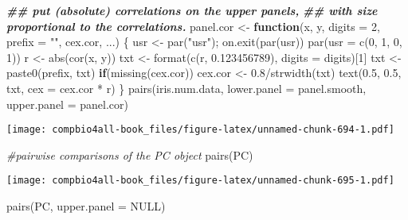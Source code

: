 \documentclass[
]{book}
\newenvironment{Shaded}{\begin{snugshade}}{\end{snugshade}}
\newcommand{\AttributeTok}[1]{\textcolor[rgb]{0.77,0.63,0.00}{#1}}
\newcommand{\CommentTok}[1]{\textcolor[rgb]{0.56,0.35,0.01}{\textit{#1}}}
\newcommand{\ConstantTok}[1]{\textcolor[rgb]{0.00,0.00,0.00}{#1}}
\newcommand{\ControlFlowTok}[1]{\textcolor[rgb]{0.13,0.29,0.53}{\textbf{#1}}}
\newcommand{\DecValTok}[1]{\textcolor[rgb]{0.00,0.00,0.81}{#1}}
\newcommand{\DocumentationTok}[1]{\textcolor[rgb]{0.56,0.35,0.01}{\textbf{\textit{#1}}}}
\newcommand{\FloatTok}[1]{\textcolor[rgb]{0.00,0.00,0.81}{#1}}
\newcommand{\FunctionTok}[1]{\textcolor[rgb]{0.00,0.00,0.00}{#1}}
\newcommand{\NormalTok}[1]{#1}
\newcommand{\OtherTok}[1]{\textcolor[rgb]{0.56,0.35,0.01}{#1}}
\newcommand{\SpecialCharTok}[1]{\textcolor[rgb]{0.00,0.00,0.00}{#1}}
\newcommand{\StringTok}[1]{\textcolor[rgb]{0.31,0.60,0.02}{#1}}
\begin{document}
\begin{Shaded}
\begin{Highlighting}[]
\DocumentationTok{\#\# put (absolute) correlations on the upper panels,}
\DocumentationTok{\#\# with size proportional to the correlations.}
\NormalTok{panel.cor }\OtherTok{\textless{}{-}} \ControlFlowTok{function}\NormalTok{(x, y, }\AttributeTok{digits =} \DecValTok{2}\NormalTok{, }\AttributeTok{prefix =} \StringTok{""}\NormalTok{, cex.cor, ...)}
\NormalTok{\{}
\NormalTok{  usr }\OtherTok{\textless{}{-}} \FunctionTok{par}\NormalTok{(}\StringTok{"usr"}\NormalTok{); }\FunctionTok{on.exit}\NormalTok{(}\FunctionTok{par}\NormalTok{(usr))}
  \FunctionTok{par}\NormalTok{(}\AttributeTok{usr =} \FunctionTok{c}\NormalTok{(}\DecValTok{0}\NormalTok{, }\DecValTok{1}\NormalTok{, }\DecValTok{0}\NormalTok{, }\DecValTok{1}\NormalTok{))}
\NormalTok{  r }\OtherTok{\textless{}{-}} \FunctionTok{abs}\NormalTok{(}\FunctionTok{cor}\NormalTok{(x, y))}
\NormalTok{  txt }\OtherTok{\textless{}{-}} \FunctionTok{format}\NormalTok{(}\FunctionTok{c}\NormalTok{(r, }\FloatTok{0.123456789}\NormalTok{), }\AttributeTok{digits =}\NormalTok{ digits)[}\DecValTok{1}\NormalTok{]}
\NormalTok{  txt }\OtherTok{\textless{}{-}} \FunctionTok{paste0}\NormalTok{(prefix, txt)}
  \ControlFlowTok{if}\NormalTok{(}\FunctionTok{missing}\NormalTok{(cex.cor)) cex.cor }\OtherTok{\textless{}{-}} \FloatTok{0.8}\SpecialCharTok{/}\FunctionTok{strwidth}\NormalTok{(txt)}
  \FunctionTok{text}\NormalTok{(}\FloatTok{0.5}\NormalTok{, }\FloatTok{0.5}\NormalTok{, txt, }\AttributeTok{cex =}\NormalTok{ cex.cor }\SpecialCharTok{*}\NormalTok{ r)}
\NormalTok{\}}
\FunctionTok{pairs}\NormalTok{(iris.num.data, }\AttributeTok{lower.panel =}\NormalTok{ panel.smooth, }\AttributeTok{upper.panel =}\NormalTok{ panel.cor)}
\end{Highlighting}
\end{Shaded}

\texttt{[image: compbio4all-book\_files/figure-latex/unnamed-chunk-694-1.pdf]}

\begin{Shaded}
\begin{Highlighting}[]
\CommentTok{\#pairwise comparisons of the PC object}
\FunctionTok{pairs}\NormalTok{(PC)}
\end{Highlighting}
\end{Shaded}

\texttt{[image: compbio4all-book\_files/figure-latex/unnamed-chunk-695-1.pdf]}

\begin{Shaded}
\begin{Highlighting}[]
\FunctionTok{pairs}\NormalTok{(PC, }\AttributeTok{upper.panel =} \ConstantTok{NULL}\NormalTok{)}
\end{Highlighting}
\end{Shaded}
\end{document}
